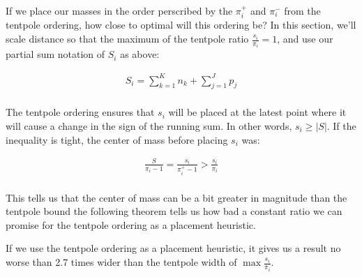 If we place our masses in the order perscribed by the $\pi^+_i$ and $\pi^-_i$ from the tentpole ordering, how close to optimal will this ordering be? In this section, we'll scale distance so that the maximum of the tentpole ratio $\frac{s_i}{\pi_i} = 1$, and use our partial sum notation of $S_i$ as above:

\begin{align*}
S_i = \sum_{k=1}^{K} n_k + \sum_{j=1}^{J} p_j \\
\end{align*}

The tentpole ordering ensures that $s_i$ will be placed at the latest point where it will cause a change in the sign of the running sum. In other words, $s_i \geq |S|$.  If the inequality is tight, the center of mass before placing $s_i$ was:

\begin{align*}
\frac{S}{\pi_i -1} = \frac{s_i}{\pi^+_i -1} > \frac{s_i}{\pi_i} \\
\end{align*}

This tells us that the center of mass can be a bit greater in magnitude than the tentpole bound the following theorem tells us how bad a constant ratio we can promise for the tentpole ordering as a placement heuristic.

\begin{thm} \label{thm:tentpoleHeuristicBound}
If we use the tentpole ordering as a placement heuristic, it gives us a result no worse than 2.7 times wider than the tentpole width of $\max \frac{s_i}{\pi_i}$.
\end{thm}

